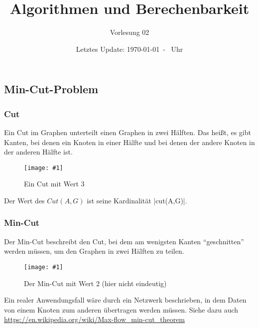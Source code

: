 \documentclass{scrartcl}%
\newcommand{\includepic}[2]{\texttt{[image: \#1]}}
\begin{document}
    \subject{Vorlesungsmitschrieb}
    \title{Algorithmen und Berechenbarkeit}
    \subtitle{Vorlesung 02}
    \date{Letztes Update: \today \ - \currenttime \ Uhr}
    \maketitle

    \subsection*{Min-Cut-Problem}
    \label{subsec:mincutproblem}

    \subsubsection*{Cut}
    \label{subsubsec:cut}

    Ein Cut im Graphen unterteilt einen Graphen in zwei Hälften.
    Das heißt, es gibt Kanten, bei denen ein Knoten in einer
    Hälfte und bei denen der andere Knoten in der anderen Hälfte ist.

    \begin{figure}[htb]
        \centering
        \includepic{lec_02_a}{0.35}
        \caption{Ein Cut mit Wert 3}
    \end{figure}

    Der Wert des $Cut(A,G)$ ist seine Kardinalität |cut(A,G)|.

    \subsubsection*{Min-Cut}
    \label{subsubsec:mincut}
    Der Min-Cut beschreibt den Cut, bei dem am wenigsten Kanten "`geschnitten"' werden müssen,
    um den Graphen in zwei Hälften zu teilen.

    \begin{figure}[htb]
        \centering
        \includepic{lec_02_b}{0.35}
        \caption{Der Min-Cut mit Wert 2 (hier nicht eindeutig)}
    \end{figure}

    Ein realer Anwendungsfall wäre durch ein Netzwerk beschrieben,
    in dem Daten von einem Knoten zum anderen übertragen werden müssen.
    Siehe dazu auch \url{https://en.wikipedia.org/wiki/Max-flow_min-cut_theorem}
\end{document}
